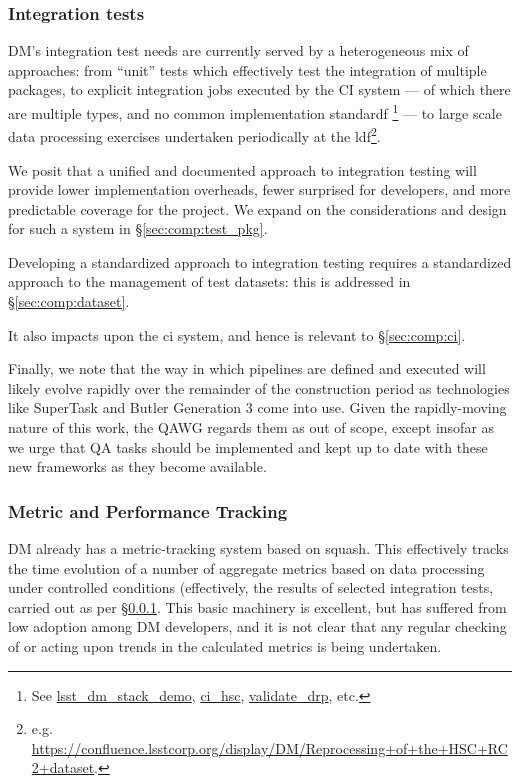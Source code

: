 \subsubsection{Integration tests}
\label{sec:design:test:integration}

DM's integration test needs are currently served by a heterogeneous mix of
approaches: from ``unit'' tests which effectively test the integration of
multiple packages, to explicit integration jobs executed by the CI
system --- of which there are multiple types, and no common
implementation standardf \footnote{See
\href{https://github.com/lsst/lsst_dm_stack_demo}{lsst\_dm\_stack\_demo},
\href{https://github.com/lsst/ci_hsc}{ci\_hsc},
\href{https://github.com/lsst/validate_drp}{validate\_drp}, etc.} --- to large
scale data processing exercises undertaken periodically at the
\gls{ldf}\footnote{e.g.
\url{https://confluence.lsstcorp.org/display/DM/Reprocessing+of+the+HSC+RC2+dataset}.}.

We posit that a unified and documented approach to integration testing will
provide lower implementation overheads, fewer surprised for developers, and
more predictable coverage for the project. We expand on the considerations and
design for such a system in \S\ref{sec:comp:test_pkg}.

Developing a standardized approach to integration testing requires a
standardized approach to the management of test datasets: this is addressed in
\S\ref{sec:comp:dataset}.

It also impacts upon the \gls{ci} system, and hence is relevant to
\S\ref{sec:comp:ci}.

Finally, we note that the way in which pipelines are defined and executed will
likely evolve rapidly over the remainder of the construction period as
technologies like SuperTask and Butler Generation 3 come into use. Given the
rapidly-moving nature of this work, the QAWG regards them as out of scope,
except insofar as we urge that QA tasks should be implemented and kept up to
date with these new frameworks as they become available.

\subsubsection{Metric and Performance Tracking}

DM already has a metric-tracking system based on \gls{squash}. This
effectively tracks the time evolution of a number of \glspl{aggregate metric}
based on data processing under controlled conditions (effectively, the results
of selected integration tests, carried out as per
\S\ref{sec:design:test:integration}. This basic machinery is excellent, but
has suffered from low adoption among DM developers, and it is not clear that
any regular checking of or acting upon trends in the calculated metrics is
being undertaken.

